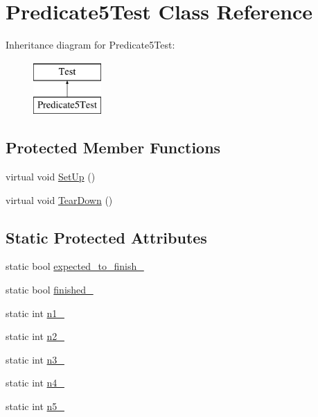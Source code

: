 \hypertarget{classPredicate5Test}{\section{\-Predicate5\-Test \-Class \-Reference}
\label{d3/d98/classPredicate5Test}
}
\-Inheritance diagram for \-Predicate5\-Test\-:\begin{figure}[H]
\begin{center}
\leavevmode
\includegraphics[height=2.000000cm]{d3/d98/classPredicate5Test}
\end{center}
\end{figure}
\subsection*{\-Protected \-Member \-Functions}
\begin{DoxyCompactItemize}
\item 
virtual void \hyperlink{classPredicate5Test_a901706a587f9ae84df8b2395fbe759cb}{\-Set\-Up} ()
\item 
virtual void \hyperlink{classPredicate5Test_a870a092058305911f3d42df45dd657e5}{\-Tear\-Down} ()
\end{DoxyCompactItemize}
\subsection*{\-Static \-Protected \-Attributes}
\begin{DoxyCompactItemize}
\item 
static bool \hyperlink{classPredicate5Test_af30fae6aaebdd5a6cb055c420573754d}{expected\-\_\-to\-\_\-finish\-\_\-}
\item 
static bool \hyperlink{classPredicate5Test_a9189d6cfedf2ace6f5f6aa152ba38f83}{finished\-\_\-}
\item 
static int \hyperlink{classPredicate5Test_a7a61c539c18d10f12696fc25b115d699}{n1\-\_\-}
\item 
static int \hyperlink{classPredicate5Test_a7dc886196252de63d1ca064997069377}{n2\-\_\-}
\item 
static int \hyperlink{classPredicate5Test_a08d9124d5401436eacd3e57dae0dbe2f}{n3\-\_\-}
\item 
static int \hyperlink{classPredicate5Test_aff849f20105b63bab116cb4e43ea8486}{n4\-\_\-}
\item 
static int \hyperlink{classPredicate5Test_a5030410dbfac5fb5bb099fad825fe7af}{n5\-\_\-}
\end{DoxyCompactItemize}


